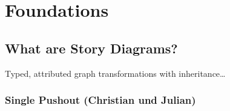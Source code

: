 \chapter{Foundations}

\section{What are Story Diagrams?}

Typed, attributed graph transformations with inheritance\ldots

\subsection{Single Pushout (Christian und Julian)}